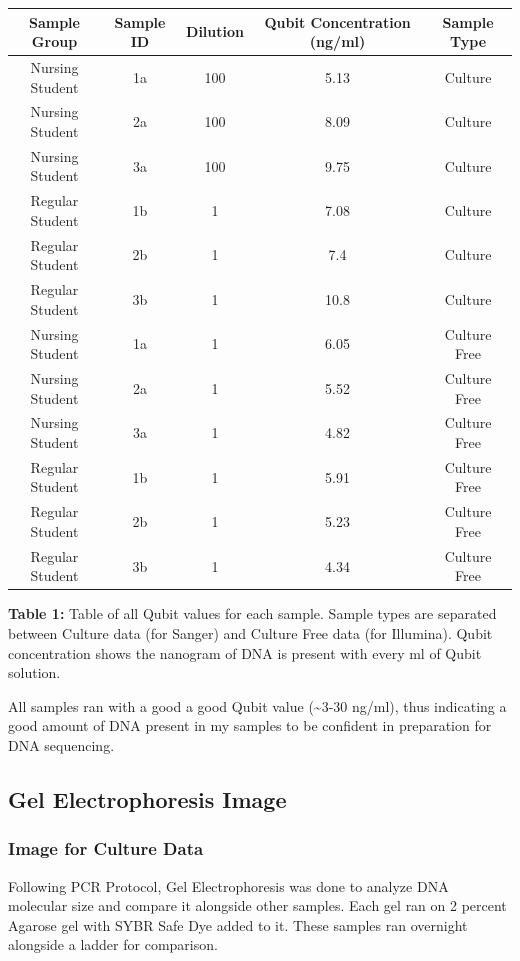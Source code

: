 \documentclass[]{article}
\begin{document}
\begin{longtable}[]{@{}ccccc@{}}
\toprule
Sample Group & Sample ID & Dilution & Qubit Concentration (ng/ml) &
Sample Type\tabularnewline
\midrule
\endhead
Nursing Student & 1a & 100 & 5.13 & Culture\tabularnewline
Nursing Student & 2a & 100 & 8.09 & Culture\tabularnewline
Nursing Student & 3a & 100 & 9.75 & Culture\tabularnewline
Regular Student & 1b & 1 & 7.08 & Culture\tabularnewline
Regular Student & 2b & 1 & 7.4 & Culture\tabularnewline
Regular Student & 3b & 1 & 10.8 & Culture\tabularnewline
Nursing Student & 1a & 1 & 6.05 & Culture Free\tabularnewline
Nursing Student & 2a & 1 & 5.52 & Culture Free\tabularnewline
Nursing Student & 3a & 1 & 4.82 & Culture Free\tabularnewline
Regular Student & 1b & 1 & 5.91 & Culture Free\tabularnewline
Regular Student & 2b & 1 & 5.23 & Culture Free\tabularnewline
Regular Student & 3b & 1 & 4.34 & Culture Free\tabularnewline
\bottomrule
\end{longtable}

\textbf{Table 1:} Table of all Qubit values for each sample. Sample
types are separated between Culture data (for Sanger) and Culture Free
data (for Illumina). Qubit concentration shows the nanogram of DNA is
present with every ml of Qubit solution.

All samples ran with a good a good Qubit value (\textasciitilde{}3-30
ng/ml), thus indicating a good amount of DNA present in my samples to be
confident in preparation for DNA sequencing.

\hypertarget{gel-electrophoresis-image}{%
\subsection{Gel Electrophoresis Image}\label{gel-electrophoresis-image}}

\hypertarget{image-for-culture-data}{%
\subsubsection{Image for Culture Data}\label{image-for-culture-data}}

Following PCR Protocol, Gel Electrophoresis was done to analyze DNA
molecular size and compare it alongside other samples. Each gel ran on 2
percent Agarose gel with SYBR Safe Dye added to it. These samples ran
overnight alongside a ladder for comparison.
\end{document}

